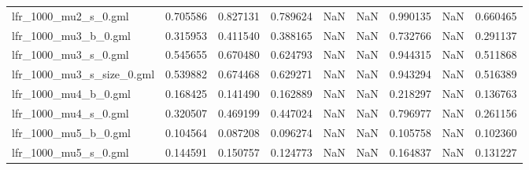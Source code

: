 \begin{tabular}{lrrrrrrrr}
lfr\_1000\_mu2\_s\_0.gml       &                            0.705586 &                       0.827131 &                          0.789624 &                           NaN &                             NaN &                     0.990135 &                                 NaN &                                0.660465 \\
lfr\_1000\_mu3\_b\_0.gml       &                            0.315953 &                       0.411540 &                          0.388165 &                           NaN &                             NaN &                     0.732766 &                                 NaN &                                0.291137 \\
lfr\_1000\_mu3\_s\_0.gml       &                            0.545655 &                       0.670480 &                          0.624793 &                           NaN &                             NaN &                     0.944315 &                                 NaN &                                0.511868 \\
lfr\_1000\_mu3\_s\_size\_0.gml  &                            0.539882 &                       0.674468 &                          0.629271 &                           NaN &                             NaN &                     0.943294 &                                 NaN &                                0.516389 \\
lfr\_1000\_mu4\_b\_0.gml       &                            0.168425 &                       0.141490 &                          0.162889 &                           NaN &                             NaN &                     0.218297 &                                 NaN &                                0.136763 \\
lfr\_1000\_mu4\_s\_0.gml       &                            0.320507 &                       0.469199 &                          0.447024 &                           NaN &                             NaN &                     0.796977 &                                 NaN &                                0.261156 \\
lfr\_1000\_mu5\_b\_0.gml       &                            0.104564 &                       0.087208 &                          0.096274 &                           NaN &                             NaN &                     0.105758 &                                 NaN &                                0.102360 \\
lfr\_1000\_mu5\_s\_0.gml       &                            0.144591 &                       0.150757 &                          0.124773 &                           NaN &                             NaN &                     0.164837 &                                 NaN &                                0.131227 \\

\end{tabular}

